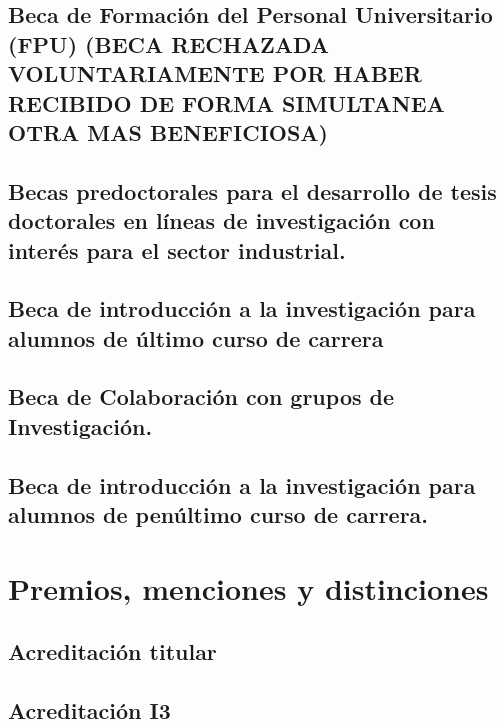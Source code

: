 \documentclass[a4paper, 11pt, twoside, openright]{report}
\begin{document}
\subsection{Beca de Formación del Personal Universitario (FPU) (BECA RECHAZADA VOLUNTARIAMENTE POR HABER RECIBIDO DE FORMA SIMULTANEA OTRA MAS BENEFICIOSA)}

\subsection{Becas predoctorales para el desarrollo de tesis doctorales en líneas de investigación con interés para el sector industrial.}

\subsection{Beca de introducción a la investigación para alumnos de último curso de carrera}

\subsection{Beca de Colaboración con grupos de Investigación.}

\subsection{Beca de introducción a la investigación para alumnos de penúltimo curso de carrera.}



\section{Premios, menciones y distinciones}

\subsection{Acreditación titular}

\subsection{Acreditación I3}

\end{document}
